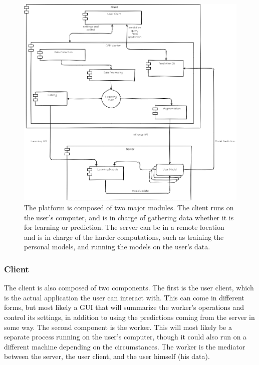 \documentclass[../main.tex]{subfiles}
\begin{document}
\begin{figure}[htp]
    \centering
    \includegraphics[width=12cm]{figures/platform_architecture.png}   
    \caption{The platform is composed of two major modules. The client runs on the user's computer,
        and is in charge of gathering data whether it is for learning or prediction.
        The server can be in a remote location and is in charge of the harder computations,
        such as training the personal models, and running the models on the user's data.}
    \label{fig:system_architecture} 
\end{figure}

\subsubsection{Client}
The client is also composed of two components. The first is the user client, which is the actual application the user can interact with.
This can come in different forms, but most likely a GUI that will summarize the worker's operations and control its settings,
in addition to using the predictions coming from the server in some way. The second component is the worker. This will most likely be a
separate process running on the user's computer, though it could also run on a different machine depending on the circumstances.
The worker is the mediator between the server, the user client, and the user himself (his data).
\end{document}
